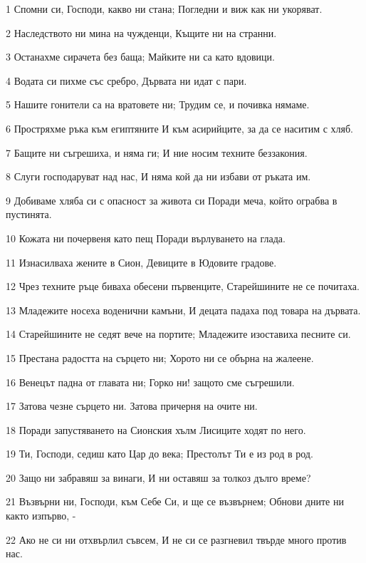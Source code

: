 \par 1 Спомни си, Господи, какво ни стана; Погледни и виж как ни укоряват.
\par 2 Наследството ни мина на чужденци, Къщите ни на странни.
\par 3 Останахме сирачета без баща; Майките ни са като вдовици.
\par 4 Водата си пихме със сребро, Дървата ни идат с пари.
\par 5 Нашите гонители са на вратовете ни; Трудим се, и почивка нямаме.
\par 6 Простряхме ръка към египтяните И към асирийците, за да се наситим с хляб.
\par 7 Бащите ни съгрешиха, и няма ги; И ние носим техните беззакония.
\par 8 Слуги господаруват над нас, И няма кой да ни избави от ръката им.
\par 9 Добиваме хляба си с опасност за живота си Поради меча, който ограбва в пустинята.
\par 10 Кожата ни почервеня като пещ Поради върлуването на глада.
\par 11 Изнасилваха жените в Сион, Девиците в Юдовите градове.
\par 12 Чрез техните ръце биваха обесени първенците, Старейшините не се почитаха.
\par 13 Младежите носеха воденични камъни, И децата падаха под товара на дървата.
\par 14 Старейшините не седят вече на портите; Младежите изоставиха песните си.
\par 15 Престана радостта на сърцето ни; Хорото ни се обърна на жалеене.
\par 16 Венецът падна от главата ни; Горко ни! защото сме съгрешили.
\par 17 Затова чезне сърцето ни. Затова причерня на очите ни.
\par 18 Поради запустяването на Сионския хълм Лисиците ходят по него.
\par 19 Ти, Господи, седиш като Цар до века; Престолът Ти е из род в род.
\par 20 Защо ни забравяш за винаги, И ни оставяш за толкоз дълго време?
\par 21 Възвърни ни, Господи, към Себе Си, и ще се възвърнем; Обнови дните ни както изпърво, -
\par 22 Ако не си ни отхвърлил съвсем, И не си се разгневил твърде много против нас.

